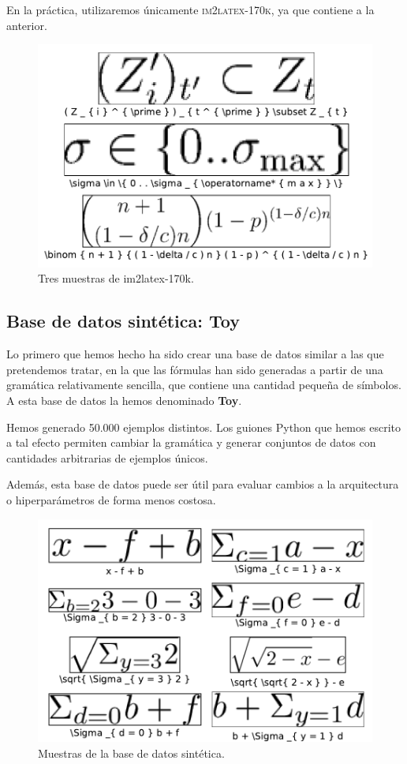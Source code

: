 \documentclass[a4paper, 20pt, dvipsnames]{article}
\begin{document}
En la práctica, utilizaremos únicamente \textsc{im2latex-170k}, ya que contiene
a la anterior.

\begin{figure}[H]
	\centering
	\includegraphics{./fig/ejemplo-im2latex.pdf}
	\caption{Tres muestras de im2latex-170k.}
	\label{fig:muestras-1}
\end{figure}


\subsection{Base de datos sintética: Toy}
\label{sec:toy}

Lo primero que hemos hecho ha sido crear una base de datos similar a las que
pretendemos tratar, en la que las fórmulas han sido generadas a partir de una
gramática relativamente sencilla, que contiene una cantidad pequeña de símbolos.
A esta base de datos la hemos denominado \textbf{Toy}.

Hemos generado 50.000 ejemplos distintos. Los guiones Python que hemos escrito a
tal efecto permiten cambiar la gramática y generar conjuntos de datos con
cantidades arbitrarias de ejemplos únicos.

Además, esta base de datos puede ser útil para evaluar cambios a la arquitectura
o hiperparámetros de forma menos costosa.

\begin{figure}[H]
	\centering
	\includegraphics{fig/ejemplo-sintetica.pdf}
	\caption{Muestras de la base de datos sintética.}
	\label{fig:muestras-sintetica}
\end{figure}
\end{document}
